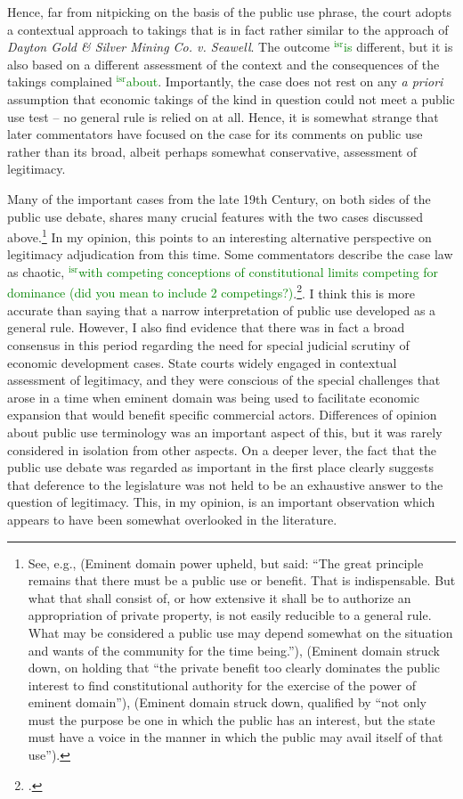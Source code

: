 \documentclass[12pt,a4paper]{book} %
\newcommand{\isr}[1]{\textcolor{green}{$^{\textrm{isr}}${#1}}}
\begin{document}
Hence, far from nitpicking on the basis of the public use phrase, the court adopts a contextual approach to takings that is in fact rather similar to the approach of {\it Dayton Gold \& Silver Mining Co. v. Seawell}. The outcome \isr{is} different, but it is also based on a different assessment of the context and the consequences of the takings complained \isr{about}. Importantly, the case does not rest on any {\it a priori} assumption that economic takings of the kind in question could not meet a public use test -- no general rule is relied on at all. Hence, it is somewhat strange that later commentators have focused on the case for its comments on public use rather than its broad, albeit perhaps somewhat conservative, assessment of legitimacy. 

Many of the important cases from the late 19th Century, on both sides of the public use debate, shares many crucial features with the two cases discussed above.\footnote{See, e.g., \cite{scudder32} (Eminent domain power upheld, but said: ``The great principle remains that there must be a public use or benefit. That is indispensable. But what that shall consist of, or how extensive it shall be to authorize an appropriation of private property, is not easily reducible to a general rule. What may be considered a public use may depend somewhat on the situation and wants of the community for the time being.''), \cite{fallsburg03} (Eminent domain struck down, on holding that ``the private benefit too clearly dominates the public interest to find constitutional authority for the exercise of the power of eminent domain''), \cite[538]{board91} (Eminent domain struck down, qualified by ``not only must the purpose be one in which the public has an interest, but the state must have a voice in the manner in which the public may avail itself of that use'').} In my opinion, this points to an interesting alternative perspective on legitimacy adjudication from this time. Some commentators describe the case law as chaotic, \isr{with competing conceptions of constitutional limits competing for dominance (did you mean to include 2 competings?)}.\footcite{berger78,meidinger80}. I think this is more accurate than saying that a narrow interpretation of public use developed as a general rule. However, I also find evidence that there was in fact a broad consensus in this period regarding the need for special judicial scrutiny of economic development cases. State courts widely engaged in contextual assessment of legitimacy, and they were conscious of the special challenges that arose in a time when eminent domain was being used to facilitate economic expansion that would benefit specific commercial actors. Differences of opinion about public use terminology was an important aspect of this, but it was rarely considered in isolation from other aspects. On a deeper lever, the fact that the public use debate was regarded as important in the first place clearly suggests that deference to the legislature was not held to be an exhaustive answer to the question of legitimacy. This, in my opinion, is an important observation which appears to have been somewhat overlooked in the literature. 
\end{document}
